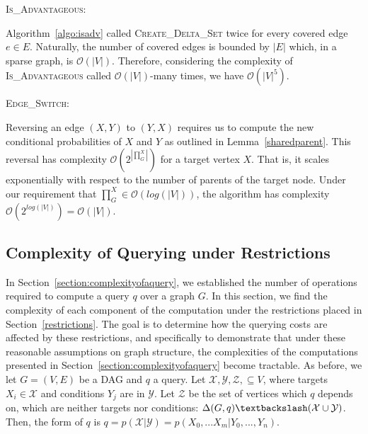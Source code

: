 \textsc{Is\_Advantageous:} 
\begin{myindentpar}{1.5em}Algorithm~\ref{algo:isadv} called \textsc{Create\_Delta\_Set} twice for every covered edge $e\in E$. Naturally, the number of covered edges is bounded by $|E|$ which, in a sparse graph, is $\mathcal{O}(|V|)$. Therefore, considering the complexity of \textsc{Is\_Advantageous} called $\mathcal{O}(|V|)$-many times, we have $\mathcal{O}(|V|^{5})$. \newline
\end{myindentpar}

\textsc{Edge\_Switch:} 
\begin{myindentpar}{1.5em}Reversing an edge $(X,Y)$ to $(Y,X)$ requires us to compute the new conditional probabilities of $X$ and $Y$ as outlined in Lemma~\ref{sharedparent}. This reversal has complexity $\mathcal{O}(2^{|\prod_{G}^{X}|})$ for a target vertex $X$. That is, it scales exponentially with respect to the number of parents of the target node. Under our requirement that $\prod_{G}^{X} \in \mathcal{O}(log(|V|))$, the algorithm has complexity $\mathcal{O}(2^{log(|V|)}) = \mathcal{O}(|V|)$.  \newline
\end{myindentpar}

\subsection{Complexity of Querying under Restrictions}

\null \quad \quad  In Section~\ref{section:complexityofaquery}, we established the number of operations required to compute a query $q$ over a graph $G$. In this section, we find the complexity of each component of the computation under the restrictions placed in Section~\cref{restrictions}. The goal is to determine how the querying costs are affected by these restrictions, and specifically to demonstrate that under these reasonable assumptions on graph structure, the complexities of the computations presented in Section~\ref{section:complexityofaquery} become tractable. \newline
\null \quad \quad As before, we let $G = (V,E)$ be a DAG and $q$ a query. Let $\mathcal{X}, \mathcal{Y}, \mathcal{Z}, \subseteq V$, where targets $X_{i} \in \mathcal{X}$ and conditions $Y_{j}$ are in $\mathcal{Y}$. Let $\mathcal{Z}$ be the set of vertices which $q$ depends on, which are neither targets nor conditions: $\Delta(G,q) \textbackslash (\mathcal{X} \cup \mathcal{Y})$. Then, the form of $q$ is $q = p(\mathcal{X}|\mathcal{Y}) = p(X_{0},...X_{m}|Y_{0},...,Y_{n})$. \newline

